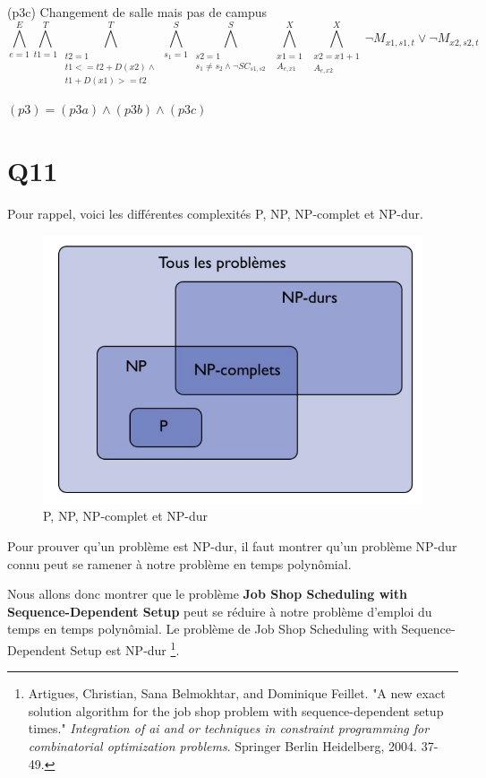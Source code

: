 \documentclass[a4paper,11pt]{article}
\begin{document}
(p3c) Changement de salle mais pas de campus
\begin{displaymath}
\bigwedge\limits_{e=1}^{E}\bigwedge\limits_{t1=1}^{T}\bigwedge\limits_{\substack{t2=1 \\ t1 <= t2 + D(x2) \wedge \\ t1 + D(x1) >= t2}}^{T}\bigwedge\limits_{s_{1}=1}^{S}\bigwedge\limits_{\substack{s2=1 \\ s_{1} \neq s_{2} \wedge \neg SC_{s1,s2} }}^{S}\bigwedge\limits_{\substack{x1=1 \\ A_{e,x1}}}^{X}\bigwedge\limits_{\substack{x2=x1+1 \\ A_{e,x2}}}^{X} \neg M_{x1, s1, t} \vee \neg M_{x2, s2, t}
\end{displaymath}


$ (p3) = (p3a) \wedge (p3b) \wedge (p3c)$


\section{Q11}
Pour rappel, voici les différentes complexités P, NP, NP-complet et NP-dur.
\begin{figure}[H]
  \centering
  \includegraphics[scale=0.4]{images/q11-p-np-nphardcomplete.png}
  \caption{\label{} P, NP, NP-complet et NP-dur}
\end{figure}
Pour prouver qu'un problème est NP-dur, il faut montrer qu'un problème NP-dur connu peut se ramener à notre problème en temps polynômial.

Nous allons donc montrer que le problème \textbf{Job Shop Scheduling with Sequence-Dependent Setup} peut se réduire à notre problème d'emploi du temps en temps polynômial. Le problème de Job Shop Scheduling with Sequence-Dependent Setup est NP-dur \footnote{Artigues, Christian, Sana Belmokhtar, and Dominique Feillet. "A new exact solution algorithm for the job shop problem with sequence-dependent setup times." \textit{Integration of ai and or techniques in constraint programming for combinatorial optimization problems}. Springer Berlin Heidelberg, 2004. 37-49.}.
\end{document}
